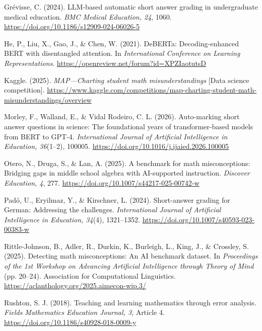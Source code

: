 \documentclass[11pt,oneside,openany]{book}
\begin{document}
\begin{list}{}{%
  \setlength{\leftmargin}{1.27cm}%
  \setlength{\itemindent}{-1.27cm}%
  \setlength{\itemsep}{0.9em}}
\item Grévisse, C. (2024). LLM-based automatic short answer grading in
undergraduate medical education. \emph{BMC Medical Education, 24}, 1060.
\url{https://doi.org/10.1186/s12909-024-06026-5}

\item He, P., Liu, X., Gao, J., \& Chen, W. (2021). DeBERTa: Decoding-enhanced
BERT with disentangled attention. In \emph{International Conference on Learning
Representations}. \url{https://openreview.net/forum?id=XPZIaotutsD}

\item Kaggle. (2025). \emph{MAP---Charting student math misunderstandings}
[Data science competition].
\url{https://www.kaggle.com/competitions/map-charting-student-math-misunderstandings/overview}

\item Morley, F., Walland, E., \& Vidal Rodeiro, C. L. (2026). Auto-marking short
answer questions in science: The foundational years of transformer-based models
from BERT to GPT-4. \emph{International Journal of Artificial Intelligence in
Education, 36}(1--2), 100005.
\url{https://doi.org/10.1016/j.ijaied.2026.100005}

\item Otero, N., Druga, S., \& Lan, A. (2025). A benchmark for math
misconceptions: Bridging gaps in middle school algebra with AI-supported
instruction. \emph{Discover Education, 4}, 277.
\url{https://doi.org/10.1007/s44217-025-00742-w}

\item Padó, U., Eryilmaz, Y., \& Kirschner, L. (2024). Short-answer grading for
German: Addressing the challenges. \emph{International Journal of Artificial
Intelligence in Education, 34}(4), 1321--1352.
\url{https://doi.org/10.1007/s40593-023-00383-w}

\item Rittle-Johnson, B., Adler, R., Durkin, K., Burleigh, L., King, J., \&
Crossley, S. (2025). Detecting math misconceptions: An AI benchmark dataset. In
\emph{Proceedings of the 1st Workshop on Advancing Artificial Intelligence through
Theory of Mind} (pp. 20--24). Association for Computational Linguistics.
\url{https://aclanthology.org/2025.aimecon-wip.3/}

\item Rushton, S. J. (2018). Teaching and learning mathematics through error
analysis. \emph{Fields Mathematics Education Journal, 3}, Article 4.
\url{https://doi.org/10.1186/s40928-018-0009-y}


\end{list}
\end{document}

